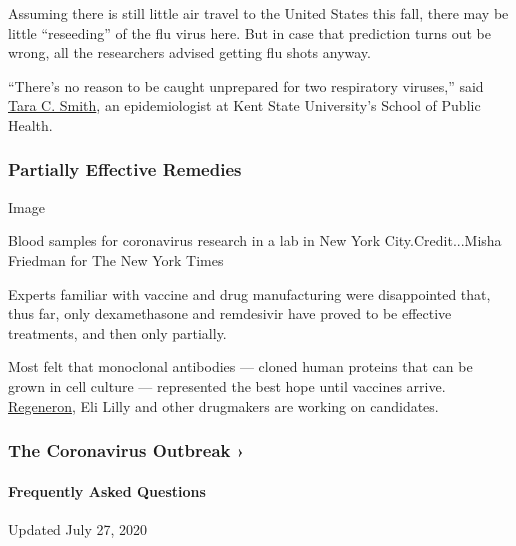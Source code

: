 Assuming there is still little air travel to the United States this
fall, there may be little ``reseeding'' of the flu virus here. But in
case that prediction turns out be wrong, all the researchers advised
getting flu shots anyway.

``There's no reason to be caught unprepared for two respiratory
viruses,'' said
\href{https://www.kent.edu/publichealth/profile/tara-c-smith-phd}{Tara
C. Smith}, an epidemiologist at Kent State University's School of Public
Health.

\hypertarget{partially-effective-remedies}{%
\subsubsection{Partially Effective
Remedies}\label{partially-effective-remedies}}

Image

Blood samples for coronavirus research in a lab in New York
City.Credit...Misha Friedman for The New York Times

Experts familiar with vaccine and drug manufacturing were disappointed
that, thus far, only dexamethasone and remdesivir have proved to be
effective treatments, and then only partially.

Most felt that monoclonal antibodies --- cloned human proteins that can
be grown in cell culture --- represented the best hope until vaccines
arrive.
\href{https://www.nytimes3xbfgragh.onion/2020/07/09/health/regeneron-monoclonal-antibodies.html}{Regeneron},
Eli Lilly and other drugmakers are working on candidates.

\href{https://www.nytimes3xbfgragh.onion/news-event/coronavirus?action=click\&pgtype=Article\&state=default\&region=MAIN_CONTENT_3\&context=storylines_faq}{}

\hypertarget{the-coronavirus-outbreak-}{%
\subsubsection{The Coronavirus Outbreak
›}\label{the-coronavirus-outbreak-}}

\hypertarget{frequently-asked-questions}{%
\paragraph{Frequently Asked
Questions}\label{frequently-asked-questions}}

Updated July 27, 2020

